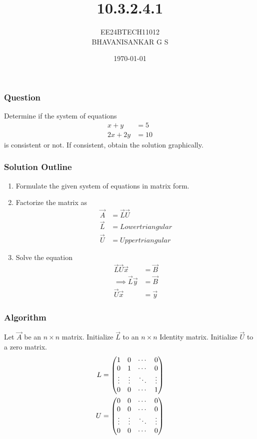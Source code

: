 \documentclass{beamer}
\begin{document}
\title{10.3.2.4.1}
\author{EE24BTECH11012 \\ BHAVANISANKAR G S }
\date{\today}
\frame{\titlepage}

\begin{frame}
\frametitle{Question}
Determine if the system of equations
\begin{align}
	x + y &= 5 \label{eq:qn} \\
	2x + 2y &= 10
\end{align}
is consistent or not. If consistent, obtain the solution graphically.
\end{frame}

\begin{frame}
\frametitle{Solution Outline}
\begin{enumerate}
\item Formulate the given system of equations in matrix form.
\item Factorize the matrix as
\begin{align}
	\vec{A} &= \vec{L} \vec{U} \\
	\vec{L} &= Lower triangular \\
	\vec{U} &= Upper triangular
\end{align}
\item Solve the equation
\begin{align}
	\vec{L} \vec{U} \vec{x} &= \vec{B} \\
	\implies \vec{L} \vec{y} &= \vec{B} \label{eq:lu1} \\
	\vec{U} \vec{x} &= \vec{y} \label{eq:lu2}
\end{align}
\end{enumerate}
\end{frame}

\begin{frame}
\frametitle{Algorithm}
Let $\vec{A}$ be an $n \times n$ matrix. Initialize $\vec{L}$ to an $n \times n$ Identity matrix. Initialize $\vec{U}$ to a zero matrix.
	\begin{align}
		L &= \begin{pmatrix}1 & 0 & \cdots & 0 \\
		            0 & 1 & \cdots & 0 \\
		            \vdots & \vdots & \ddots & \vdots \\
		            0 & 0 & \cdots & 1\end{pmatrix} \\
		U &= \begin{pmatrix}0 & 0 & \cdots & 0 \\
			    0 & 0 & \cdots & 0 \\
                            \vdots & \vdots & \ddots & \vdots \\
                            0 & 0 & \cdots & 0\end{pmatrix}
	\end{align}
\end{frame}
\end{document}
